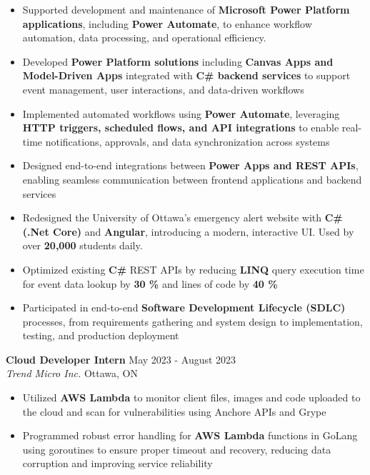 \documentclass[a4paper]{article}
\begin{document}
\begin{itemize} \itemsep -2pt
    \item Supported development and maintenance of \textbf{Microsoft Power Platform applications}, including \textbf{Power Automate}, to enhance workflow automation, data processing, and operational efficiency.
    \item Developed \textbf{Power Platform solutions} including \textbf{Canvas Apps and Model-Driven Apps} integrated with \textbf{C\# backend services} to support event management, user interactions, and data-driven workflows
    \item Implemented automated workflows using \textbf{Power Automate}, leveraging \textbf{HTTP triggers, scheduled flows, and API integrations} to enable real-time notifications, approvals, and data synchronization across systems
    \item Designed end-to-end integrations between \textbf{Power Apps and REST APIs}, enabling seamless communication between frontend applications and backend services
    \item Redesigned the University of Ottawa's emergency alert website with \textbf{C\# (.Net Core)} and \textbf{Angular}, introducing a modern, interactive UI. Used by over \textbf{20,000} students daily.
    \item Optimized existing \textbf{C\#} REST APIs by reducing \textbf{LINQ} query execution time for event data lookup by \textbf{30 \%} and lines of code by \textbf{40 \%}
    \item Participated in end-to-end \textbf{Software Development Lifecycle (SDLC)} processes, from requirements gathering and system design to implementation, testing, and production deployment
\end{itemize}
\textbf{Cloud Developer Intern} \hfill May 2023 - August 2023\\
\textit{Trend Micro Inc.} \hfill Ottawa, ON\\
\vspace{-2mm}
\begin{itemize} \itemsep -2pt
    \item Utilized \textbf{AWS Lambda} to monitor client files, images and code uploaded to the cloud and scan for vulnerabilities using Anchore APIs and Grype
        \item Programmed robust error handling for \textbf{AWS Lambda} functions in GoLang using goroutines to ensure proper timeout and recovery, reducing data corruption and improving service reliability
\end{itemize}
\end{document}
